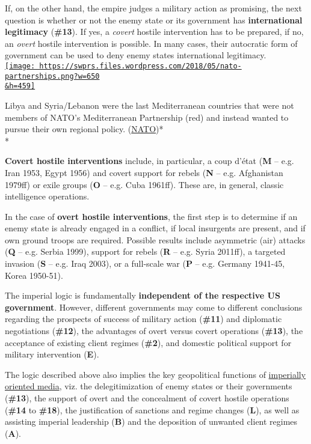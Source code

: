 If, on the other hand, the empire judges a military action as promising,
the next question is whether or not the enemy state or its government
has \textbf{international legitimacy} (\textbf{\#13}). If yes, a
\emph{covert} hostile intervention has to be prepared, if no, an
\emph{overt} hostile intervention is possible. In many cases, their
autocratic form of government can be used to deny enemy states
international legitimacy.\\
\href{https://swprs.files.wordpress.com/2018/05/nato-partnerships.png}{\texttt{[image: https://swprs.files.wordpress.com/2018/05/nato-partnerships.png?w=650\\\&h=459]}}

Libya and Syria/Lebanon were the last Mediterranean countries that were
not members of NATO's Mediterranean Partnership (red) and instead wanted
to pursue their own regional policy.
(\href{https://www.nato.int/cps/ua/natohq/topics_81136.htm}{NATO})*\\
*

\textbf{Covert hostile interventions} include, in particular, a coup
d'état (\textbf{M} -- e.g. Iran 1953, Egypt 1956) and covert support for
rebels (\textbf{N} -- e.g. Afghanistan 1979ff) or exile groups
(\textbf{O} -- e.g. Cuba 1961ff). These are, in general, classic
intelligence operations.

In the case of \textbf{overt hostile interventions}, the first step is
to determine if an enemy state is already engaged in a conflict, if
local insurgents are present, and if own ground troops are required.
Possible results include asymmetric (air) attacks (\textbf{Q} -- e.g.
Serbia 1999), support for rebels (\textbf{R} -- e.g. Syria 2011ff), a
targeted invasion (\textbf{S} -- e.g. Iraq 2003), or a full-scale war
(\textbf{P} -- e.g. Germany 1941-45, Korea 1950-51).

The imperial logic is fundamentally \textbf{independent of the
respective US government}. However, different governments may come to
different conclusions regarding the prospects of success of military
action (\textbf{\#11}) and diplomatic negotiations (\textbf{\#12}), the
advantages of overt versus covert operations (\textbf{\#13}), the
acceptance of existing client regimes (\textbf{\#2}), and domestic
political support for military intervention (\textbf{E}).

The logic described above also implies the key geopolitical functions of
\href{https://swprs.org/the-american-empire-and-its-media/}{imperially
oriented media}, viz. the delegitimization of enemy states or their
governments (\textbf{\#13}), the support of overt and the con­ceal­ment
of covert hostile operations (\textbf{\#14} to \textbf{\#18}), the
justification of sanctions and regime changes (\textbf{L}), as well as
assisting imperial leadership (\textbf{B}) and the deposition of
unwanted client regimes (\textbf{A}).

